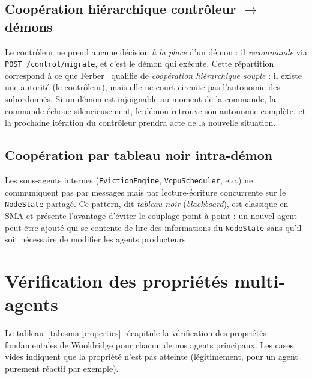 \subsection{Coopération hiérarchique contrôleur $\to$ démons}

Le contrôleur ne prend aucune décision \emph{à la place} d'un démon : il \emph{recommande} via \texttt{POST /control/migrate}, et c'est le démon qui exécute. Cette répartition correspond à ce que Ferber~\cite{ferber_1995_sma} qualifie de \emph{coopération hiérarchique souple} : il existe une autorité (le contrôleur), mais elle ne court-circuite pas l'autonomie des subordonnés. Si un démon est injoignable au moment de la commande, la commande échoue silencieusement, le démon retrouve son autonomie complète, et la prochaine itération du contrôleur prendra acte de la nouvelle situation.

\subsection{Coopération par tableau noir intra-démon}

Les sous-agents internes (\texttt{EvictionEngine}, \texttt{VcpuScheduler}, etc.) ne communiquent pas par messages mais par lecture-écriture concurrente sur le \texttt{NodeState} partagé. Ce pattern, dit \emph{tableau noir} (\emph{blackboard}), est classique en SMA et présente l'avantage d'éviter le couplage point-à-point : un nouvel agent peut être ajouté qui se contente de lire des informations du \texttt{NodeState} sans qu'il soit nécessaire de modifier les agents producteurs.

\section{Vérification des propriétés multi-agents}
\label{sec:sma-proprietes}

Le tableau~\ref{tab:sma-properties} récapitule la vérification des propriétés fondamentales de Wooldridge pour chacun de nos agents principaux. Les cases vides indiquent que la propriété n'est pas atteinte (légitimement, pour un agent purement réactif par exemple).

